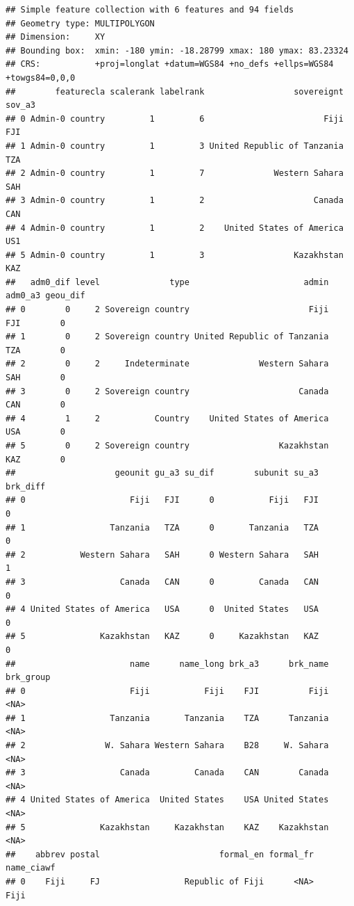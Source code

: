 \documentclass[
]{article}
\begin{document}
\begin{verbatim}
## Simple feature collection with 6 features and 94 fields
## Geometry type: MULTIPOLYGON
## Dimension:     XY
## Bounding box:  xmin: -180 ymin: -18.28799 xmax: 180 ymax: 83.23324
## CRS:           +proj=longlat +datum=WGS84 +no_defs +ellps=WGS84 +towgs84=0,0,0
##        featurecla scalerank labelrank                  sovereignt sov_a3
## 0 Admin-0 country         1         6                        Fiji    FJI
## 1 Admin-0 country         1         3 United Republic of Tanzania    TZA
## 2 Admin-0 country         1         7              Western Sahara    SAH
## 3 Admin-0 country         1         2                      Canada    CAN
## 4 Admin-0 country         1         2    United States of America    US1
## 5 Admin-0 country         1         3                  Kazakhstan    KAZ
##   adm0_dif level              type                       admin adm0_a3 geou_dif
## 0        0     2 Sovereign country                        Fiji     FJI        0
## 1        0     2 Sovereign country United Republic of Tanzania     TZA        0
## 2        0     2     Indeterminate              Western Sahara     SAH        0
## 3        0     2 Sovereign country                      Canada     CAN        0
## 4        1     2           Country    United States of America     USA        0
## 5        0     2 Sovereign country                  Kazakhstan     KAZ        0
##                    geounit gu_a3 su_dif        subunit su_a3 brk_diff
## 0                     Fiji   FJI      0           Fiji   FJI        0
## 1                 Tanzania   TZA      0       Tanzania   TZA        0
## 2           Western Sahara   SAH      0 Western Sahara   SAH        1
## 3                   Canada   CAN      0         Canada   CAN        0
## 4 United States of America   USA      0  United States   USA        0
## 5               Kazakhstan   KAZ      0     Kazakhstan   KAZ        0
##                       name      name_long brk_a3      brk_name brk_group
## 0                     Fiji           Fiji    FJI          Fiji      <NA>
## 1                 Tanzania       Tanzania    TZA      Tanzania      <NA>
## 2                W. Sahara Western Sahara    B28     W. Sahara      <NA>
## 3                   Canada         Canada    CAN        Canada      <NA>
## 4 United States of America  United States    USA United States      <NA>
## 5               Kazakhstan     Kazakhstan    KAZ    Kazakhstan      <NA>
##    abbrev postal                        formal_en formal_fr     name_ciawf
## 0    Fiji     FJ                 Republic of Fiji      <NA>           Fiji

\end{verbatim}
\end{document}
